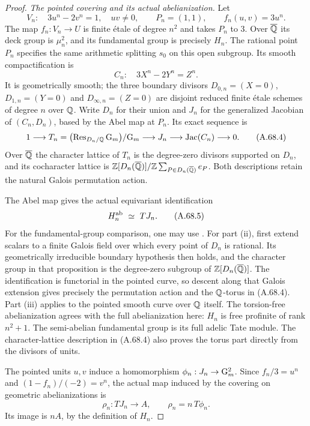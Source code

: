 \begin{proof}
\emph{The pointed covering and its actual abelianization.}
Let
\[
 V_n:\quad 3u^n-2v^n=1,\quad uv\ne0,\qquad
 P_n=(1,1),\qquad f_n(u,v)=3u^n .
 \tag{A.68.2}
\]
The map $f_n:V_n\to U$ is finite \'etale of degree $n^2$ and takes
$P_n$ to $3$.  Over $\overline{\mathbb Q}$ its deck group is $\mu_n^2$, and
its fundamental group is precisely $H_n$.
The rational point $P_n$ specifies the same arithmetic splitting
$s_0$ on this open subgroup.  Its smooth compactification is
\[
             C_n:\quad3X^n-2Y^n=Z^n.
 \tag{A.68.3}
\]
It is geometrically smooth; the three boundary divisors
$D_{0,n}=(X=0)$, $D_{1,n}=(Y=0)$ and $D_{\infty,n}=(Z=0)$
are disjoint reduced finite \'etale schemes of degree $n$ over $\mathbb Q$.
Write $D_n$ for their union and $J_n$ for the generalized Jacobian
of $(C_n,D_n)$, based by the Abel map at $P_n$.
Its exact sequence is
\[
 1\longrightarrow
 T_n=\bigl(\operatorname{Res}_{D_n/\mathbb Q}\mathrm G_m\bigr)/\mathrm G_m
 \longrightarrow J_n\longrightarrow\operatorname{Jac}(C_n)
 \longrightarrow0 .
 \tag{A.68.4}
\]
Over $\overline{\mathbb Q}$ the character lattice of $T_n$ is the degree-zero
divisors supported on $D_n$, and its cocharacter lattice is
$\mathbb Z[D_n(\overline{\mathbb Q})]/\mathbb Z\sum_{P\in D_n(\overline{\mathbb Q})}e_P$.
Both descriptions retain the natural Galois permutation action.

The Abel map gives the actual equivariant identification
\[
                H_n^{\rm ab}\ \simeq\ T J_n .
 \tag{A.68.5}
\]
For the fundamental-group comparison, one may use
\cite[Proposition A.8(ii),(iii), pp.~232--234]{BIR_MochizukiAlbanese2012}.
For part (ii), first extend scalars to a finite Galois field over which
every point of $D_n$ is rational.  Its geometrically irreducible boundary
hypothesis then holds, and the character group in that proposition is
the degree-zero subgroup of $\mathbb Z[D_n(\overline{\mathbb Q})]$.
The identification is functorial in the pointed curve, so descent along
that Galois extension gives precisely the permutation action and the
$\mathbb Q$-torus in (A.68.4).  Part (iii) applies to the pointed smooth
curve over $\mathbb Q$ itself.
The torsion-free abelianization agrees with the full
abelianization here: $H_n$ is free profinite of rank $n^2+1$.
The semi-abelian fundamental group is its full adelic Tate module.
The character-lattice description in (A.68.4) also proves the torus
part directly from the divisors of units.

The pointed units $u,v$ induce a homomorphism
$\phi_n:J_n\to\mathrm G_m^2$.
Since $f_n/3=u^n$ and $(1-f_n)/(-2)=v^n$, the actual map induced
by the covering on geometric abelianizations is
\[
 \rho_n:T J_n\longrightarrow A,\qquad
                        \rho_n=n\,T\phi_n .
 \tag{A.68.6}
\]
Its image is $nA$, by the definition of $H_n$.


\end{proof}
